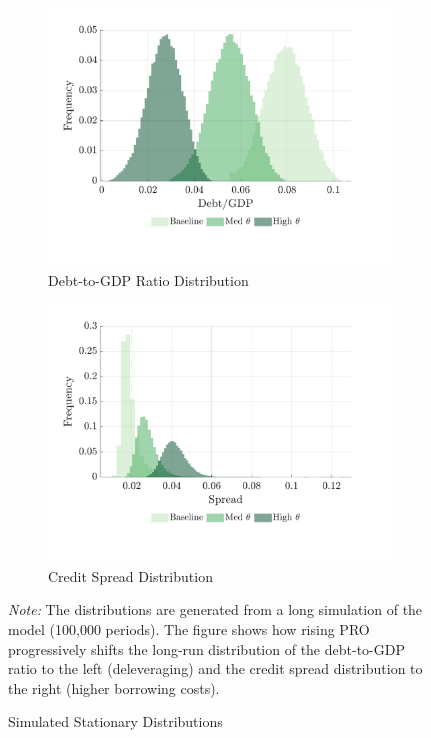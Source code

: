 \documentclass[12pt]{article}
\theoremstyle{plain}
\begin{document}
\begin{figure}[h!]
	\centering
	\begin{subfigure}[b]{0.48\textwidth}
		\centering
		\includegraphics[width=\textwidth]{../../pro-default-model/results/comparison_figure_7.pdf}
		\caption{Debt-to-GDP Ratio Distribution}
		\label{fig:dist_debt}
	\end{subfigure}
	\hfill
	\begin{subfigure}[b]{0.48\textwidth}
		\centering
		\includegraphics[width=\textwidth]{../../pro-default-model/results/comparison_figure_6.pdf}
		\caption{Credit Spread Distribution}
		\label{fig:dist_spread}
	\end{subfigure}
	\caption{Simulated Stationary Distributions}
	\label{fig:sim_distributions}
	\parbox{\linewidth}{\small\textit{Note:} The distributions are generated from a long simulation of the model (100,000 periods). The figure shows how rising PRO progressively shifts the long-run distribution of the debt-to-GDP ratio to the left (deleveraging) and the credit spread distribution to the right (higher borrowing costs).}
\end{figure}
\end{document}
